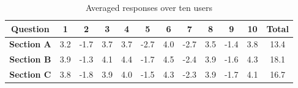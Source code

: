 \documentclass[12pt]{article}
\begin{document}
\begin{table}
\centering
\begin{tabular}{ |c|c|c|c|c|c|c|c|c|c|c|c| } 
 \hline
 \textbf{Question} & \textbf{1} & \textbf{2} & \textbf{3} & \textbf{4} & \textbf{5} & \textbf{6} & \textbf{7} & \textbf{8} & \textbf{9} & \textbf{10} & \textbf{Total} \\ 
 \hline
 \textbf{Section A} & 3.2 & -1.7 & 3.7 & 3.7 & -2.7 & 4.0 & -2.7 & 3.5 & -1.4 & 3.8 & 13.4\\ 
 
 \textbf{Section B} & 3.9 & -1.3 & 4.1 & 4.4 & -1.7 & 4.5 & -2.4 & 3.9 & -1.6 & 4.3 & 18.1\\ 
 
 \textbf{Section C} & 3.8 & -1.8 & 3.9 & 4.0 & -1.5 & 4.3 & -2.3 & 3.9 & -1.7 & 4.1 & 16.7\\ 
 \hline
\end{tabular}
\caption{Averaged responses over ten users}
\end{table}
\end{document}
